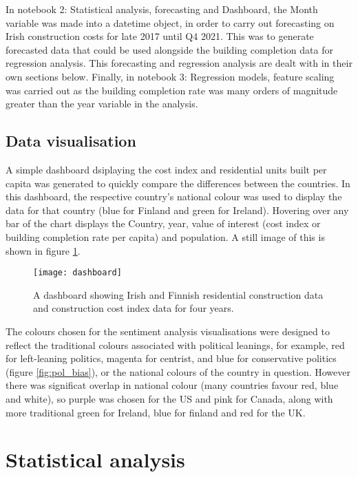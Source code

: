 \documentclass[hidelinks,12pt,oneside]{report} %
\begin{document}
In notebook 2: Statistical analysis, forecasting and Dashboard, the Month variable was made into a datetime object, in order to carry out forecasting on Irish construction costs for late 2017 until Q4 2021. This was to generate forecasted data that could be used alongside the building completion data for regression analysis. This forecasting and regression analysis are dealt with in their own sections below. Finally, in notebook 3: Regression models, feature scaling was carried out as the building completion rate was many orders of magnitude greater than the year variable in the analysis.

\subsection{Data visualisation}
A simple dashboard dsiplaying the cost index and residential units built per capita was generated to quickly compare the differences between the countries. In this dashboard, the respective country's national colour was used to display the data for that country (blue for Finland and green for Ireland). Hovering over any bar of the chart displays the Country, year, value of interest (cost index or building completion rate per capita) and population. A still image of this is shown in figure \ref{fig:dashboard}.

\begin{figure}[!ht]
	\centering
	\vspace{.4218cm}
		\texttt{[image: dashboard]}	\captionsetup{justification=justified,width=1\linewidth}
	\caption{A dashboard showing Irish and Finnish residential construction data and construction cost index data for four years.}
\label{fig:dashboard}
\end{figure}

The colours chosen for the sentiment analysis visualisations were designed to reflect the traditional colours associated with political leanings, for example, red for left-leaning politics, magenta for centrist, and blue for conservative politics (figure \ref{fig:pol_bias}), or the national colours of the country in question. However there was significat overlap in national colour (many countries favour red, blue and white), so purple was chosen for the US and pink for Canada, along with more traditional green for Ireland, blue for finland and red for the UK.

\section{Statistical analysis}
\end{document}
